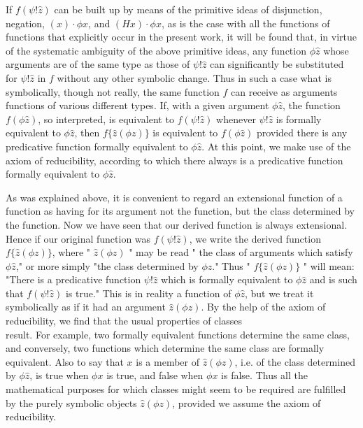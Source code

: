 \documentclass[10pt]{article}
\begin{document}
If $f(\psi!\hat{z})$ can be built up by means of the primitive ideas of disjunction, negation, $(x) \cdot \phi x$, and $(H x) \cdot \phi x$, as is the case with all the functions of functions that explicitly occur in the present work, it will be found that, in virtue of the systematic ambiguity of the above primitive ideas, any function $\phi \hat{z}$ whose arguments are of the same type as those of $\psi!\hat{z}$ can significantly be substituted for $\psi!\hat{z}$ in $f$ without any other symbolic change. Thus in such a case what is symbolically, though not really, the same function $f$ can receive as arguments functions of various different types. If, with a given argument $\phi \hat{z}$, the function $f(\phi \hat{z})$, so interpreted, is equivalent to $f(\psi!\hat{z})$ whenever $\psi!\hat{z}$ is formally equivalent to $\phi \hat{z}$, then $f\{\hat{z}(\phi z)\}$ is equivalent to $f(\phi \hat{z})$ provided there is any predicative function formally equivalent to $\phi \hat{z}$. At this point, we make use of the axiom of reducibility, according to which there always is a predicative function formally equivalent to $\phi \hat{z}$.

As was explained above, it is convenient to regard an extensional function of a function as having for its argument not the function, but the class determined by the function. Now we have seen that our derived function is always extensional. Hence if our original function was $f(\psi!\hat{z})$, we write the derived function $f\{\hat{z}(\phi z)\}$, where " $\hat{z}(\phi z)$ " may be read " the class of arguments which satisfy $\phi \hat{z}$," or more simply "the class determined by $\phi \hat{z}$." Thus " $f\{\hat{z}(\phi z)\}$ " will mean: "There is a predicative function $\psi!\hat{z}$ which is formally equivalent to $\phi \hat{z}$ and is such that $f(\psi!\hat{z})$ is true." This is in reality a function of $\phi \hat{z}$, but we treat it symbolically as if it had an argument $\hat{z}(\phi z)$. By the help of the axiom of reducibility, we find that the usual properties of classes\\
result. For example, two formally equivalent functions determine the same class, and conversely, two functions which determine the same class are formally equivalent. Also to say that $x$ is a member of $\hat{z}(\phi z)$, i.e. of the class determined by $\phi \hat{z}$, is true when $\phi x$ is true, and false when $\phi x$ is false. Thus all the mathematical purposes for which classes might seem to be required are fulfilled by the purely symbolic objects $\hat{z}(\phi z)$, provided we assume the axiom of reducibility.
\end{document}
